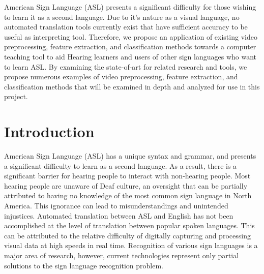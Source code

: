 \documentclass[12pt]{article}
\begin{document}


American Sign Language (ASL) presents a significant difficulty for those wishing to learn it as a 
second language. Due to it’s nature as a visual language, no automated translation tools currently exist that have sufficient accuracy to be useful as interpreting tool. Therefore, we propose an application of existing video preprocessing, feature extraction, and classification methods towards a computer teaching tool to aid Hearing learners and users of other sign languages who want to learn ASL. By examining the state-of-art for related research and tools, we propose numerous examples of video preprocessing, feature extraction, and classification methods that will be examined in depth and analyzed for use in this project.


\newpage

\onehalfspacing
\tableofcontents
\newpage
\doublespacing
{}
\listoftables
{}
\listoffigures
\newpage

\section{Introduction}
American Sign Language (ASL) has a unique syntax and grammar, and presents a significant difficulty to learn as a second language. As a result, there is a significant barrier for hearing people to interact with non-hearing people. Most hearing people are unaware of Deaf culture, an oversight that can be partially attributed to having no knowledge of the most common sign language in North America. This ignorance can lead to misunderstandings and unintended injustices. Automated translation between ASL and English has not been accomplished at the level of translation between popular spoken languages. This can be attributed to the relative difficulty of digitally capturing and processing visual data at high speeds in real time. Recognition of various sign languages is a major area of research, however, current technologies represent only partial solutions to the sign language recognition problem. 
\end{document}
